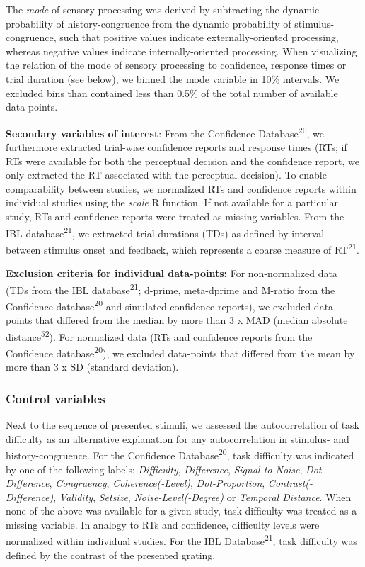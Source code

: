 \documentclass[
]{article}
\begin{document}
The \emph{mode} of sensory processing was derived by subtracting the
dynamic probability of history-congruence from the dynamic probability
of stimulus-congruence, such that positive values indicate
externally-oriented processing, whereas negative values indicate
internally-oriented processing. When visualizing the relation of the
mode of sensory processing to confidence, response times or trial
duration (see below), we binned the mode variable in 10\% intervals. We
excluded bins than contained less than 0.5\% of the total number of
available data-points.

\textbf{Secondary variables of interest}: From the Confidence
Database\textsuperscript{20}, we furthermore extracted trial-wise
confidence reports and response times (RTs; if RTs were available for
both the perceptual decision and the confidence report, we only
extracted the RT associated with the perceptual decision). To enable
comparability between studies, we normalized RTs and confidence reports
within individual studies using the \emph{scale} R function. If not
available for a particular study, RTs and confidence reports were
treated as missing variables. From the IBL database\textsuperscript{21},
we extracted trial durations (TDs) as defined by interval between
stimulus onset and feedback, which represents a coarse measure of
RT\textsuperscript{21}.

\textbf{Exclusion criteria for individual data-points:} For
non-normalized data (TDs from the IBL database\textsuperscript{21};
d-prime, meta-dprime and M-ratio from the Confidence
database\textsuperscript{20} and simulated confidence reports), we
excluded data-points that differed from the median by more than 3 x MAD
(median absolute distance\textsuperscript{52}). For normalized data (RTs
and confidence reports from the Confidence
database\textsuperscript{20}), we excluded data-points that differed
from the mean by more than 3 x SD (standard deviation).

\hypertarget{control-variables}{%
\subsubsection{Control variables}\label{control-variables}}

Next to the sequence of presented stimuli, we assessed the
autocorrelation of task difficulty as an alternative explanation for any
autocorrelation in stimulus- and history-congruence. For the Confidence
Database\textsuperscript{20}, task difficulty was indicated by one of
the following labels: \emph{Difficulty}, \emph{Difference},
\emph{Signal-to-Noise}, \emph{Dot-Difference}, \emph{Congruency},
\emph{Coherence(-Level)}, \emph{Dot-Proportion},
\emph{Contrast(-Difference)}, \emph{Validity}, \emph{Setsize},
\emph{Noise-Level(-Degree)} or \emph{Temporal Distance}. When none of
the above was available for a given study, task difficulty was treated
as a missing variable. In analogy to RTs and confidence, difficulty
levels were normalized within individual studies. For the IBL
Database\textsuperscript{21}, task difficulty was defined by the
contrast of the presented grating.
\end{document}
